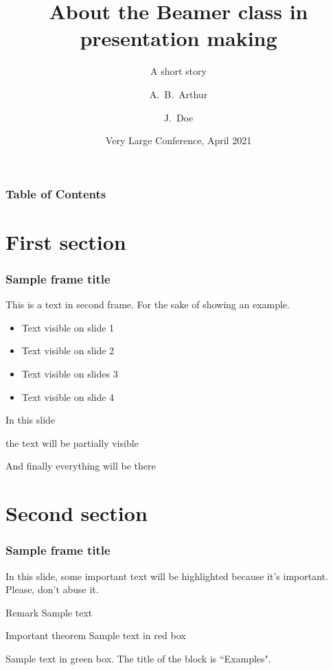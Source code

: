 \documentclass[xcolor={dvipsnames}]{beamer}
\title[About Beamer] %
{About the Beamer class in presentation making}
\subtitle{A short story}
\author[Arthur, Doe] %
{A.~B.~Arthur\inst{1} \and J.~Doe\inst{2}}
\institute[VFU] %
{
  \inst{1}%
  Faculty of Physics\\
  Very Famous University
  \and
  \inst{2}%
  Faculty of Chemistry\\
  Very Famous University
}
\date[VLC 2021] %
{Very Large Conference, April 2021}
\begin{document}
\frame{\titlepage}


\begin{frame}
\frametitle{Table of Contents}
\tableofcontents
\end{frame}


\section{First section}

\begin{frame}
\frametitle{Sample frame title}
This is a text in second frame. For the sake of showing an example.

\begin{itemize}
    \item<1-> Text visible on slide 1
    \item<2-> Text visible on slide 2
    \item<3> Text visible on slides 3
    \item<4-> Text visible on slide 4
\end{itemize}
\end{frame}



\begin{frame}
In this slide \pause

the text will be partially visible \pause

And finally everything will be there
\end{frame}

\section{Second section}

\begin{frame}
\frametitle{Sample frame title}

In this slide, some important text will be
\alert{highlighted} because it's important.
Please, don't abuse it.

\begin{block}{Remark}
Sample text
\end{block}

\begin{alertblock}{Important theorem}
Sample text in red box
\end{alertblock}

\begin{examples}
Sample text in green box. The title of the block is ``Examples".
\end{examples}
\end{frame}
\end{document}
